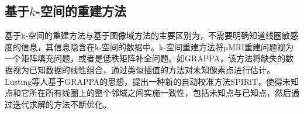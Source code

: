 \documentclass[lang=cn,11pt,a4paper,cite=numbers]{elegantpaper}
\begin{document}
\subsection{基于$k$-空间的重建方法} 
\par 基于k-空间的重建方法与基于图像域方法的主要区别为，不需要明确知道线圈敏感度的信息，其信息隐含在k-空间的数据中。k-空间重建方法将pMRI重建问题视为一个矩阵填充问题，或者是低秩矩阵补全问题。如GRAPPA，该方法将缺失的数据视为已知数据的线性组合，通过类似插值的方法对未知像素点进行估计。Lusting等人基于GRAPPA的思想，提出一种新的自动校准方法SPIRiT\cite{lustig2010spirit}，使得未知点和它所在所有线圈上的整个邻域之间实施一致性，包括未知点与已知点，然后通过迭代求解的方法不断优化。
\par 



\newpage


\end{document}
